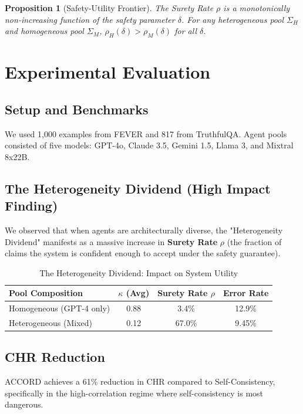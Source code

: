 \documentclass[conference]{IEEEtran}
\newtheorem{proposition}{Proposition}
\begin{document}
\begin{proposition}[Safety-Utility Frontier]
The Surety Rate $\rho$ is a monotonically non-increasing function of the safety parameter $\delta$. For any heterogeneous pool $\Sigma_H$ and homogeneous pool $\Sigma_M$, $\rho_H(\delta) > \rho_M(\delta)$ for all $\delta$.
\end{proposition}

\section{Experimental Evaluation}

\subsection{Setup and Benchmarks}
We used 1,000 examples from FEVER and 817 from TruthfulQA. Agent pools consisted of five models: GPT-4o, Claude 3.5, Gemini 1.5, Llama 3, and Mixtral 8x22B.

\subsection{The Heterogeneity Dividend (High Impact Finding)}
We observed that when agents are architecturally diverse, the "Heterogeneity Dividend" manifests as a massive increase in \textbf{Surety Rate} $\rho$ (the fraction of claims the system is confident enough to accept under the safety guarantee).

\begin{table}[htbp]
\caption{The Heterogeneity Dividend: Impact on System Utility}
\label{tab:hetero}
\centering
\begin{tabular}{lccc}
\toprule
Pool Composition & $\kappa$ (Avg) & Surety Rate $\rho$ & Error Rate \\
\midrule
Homogeneous (GPT-4 only) & 0.88 & 3.4\% & 12.9\% \\
Heterogeneous (Mixed)   & 0.12 & 67.0\% & 9.45\% \\
\bottomrule
\end{tabular}
\end{table}

\subsection{CHR Reduction}
ACCORD achieves a 61\% reduction in CHR compared to Self-Consistency, specifically in the high-correlation regime where self-consistency is most dangerous.
\end{document}
